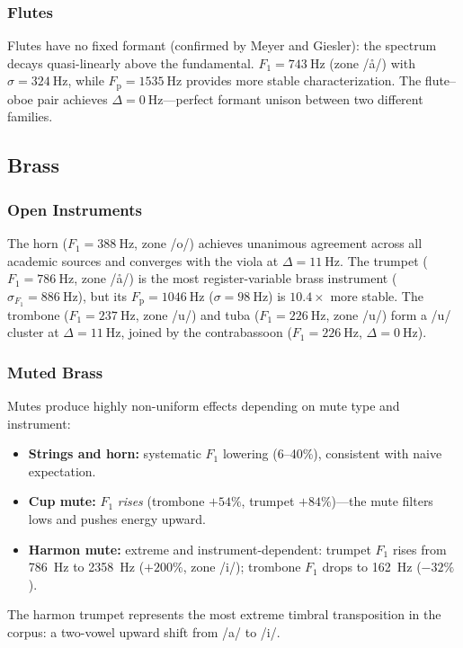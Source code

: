 \documentclass[journal]{IEEEtran}
\newcommand{\Fp}{F_\mathrm{p}}
\newcommand{\Fn}[1]{F_{#1}}
\begin{document}
\subsubsection{Flutes}
Flutes have no fixed formant (confirmed by Meyer and Giesler): the spectrum decays quasi-linearly above the fundamental. $\Fn{1} = \SI{743}{\hertz}$ (zone /\aa/) with $\sigma = \SI{324}{\hertz}$, while $\Fp = \SI{1535}{\hertz}$ provides more stable characterization. The flute--oboe pair achieves $\Delta = \SI{0}{\hertz}$---perfect formant unison between two different families.

\subsection{Brass}

\subsubsection{Open Instruments}
The horn ($\Fn{1} = \SI{388}{\hertz}$, zone /o/) achieves unanimous agreement across all academic sources and converges with the viola at $\Delta = \SI{11}{\hertz}$. The trumpet ($\Fn{1} = \SI{786}{\hertz}$, zone /\aa/) is the most register-variable brass instrument ($\sigma_{\Fn{1}} = \SI{886}{\hertz}$), but its $\Fp = \SI{1046}{\hertz}$ ($\sigma = \SI{98}{\hertz}$) is $10.4\times$ more stable. The trombone ($\Fn{1} = \SI{237}{\hertz}$, zone /u/) and tuba ($\Fn{1} = \SI{226}{\hertz}$, zone /u/) form a /u/ cluster at $\Delta = \SI{11}{\hertz}$, joined by the contrabassoon ($\Fn{1} = \SI{226}{\hertz}$, $\Delta = \SI{0}{\hertz}$).

\subsubsection{Muted Brass}
Mutes produce highly non-uniform effects depending on mute type and instrument:
\begin{itemize}
\item \textbf{Strings and horn:} systematic $\Fn{1}$ lowering (6--40\%), consistent with naive expectation.
\item \textbf{Cup mute:} $\Fn{1}$ \emph{rises} (trombone $+54\%$, trumpet $+84\%$)---the mute filters lows and pushes energy upward.
\item \textbf{Harmon mute:} extreme and instrument-dependent: trumpet $\Fn{1}$ rises from \SI{786}{\hertz} to \SI{2358}{\hertz} ($+200\%$, zone /i/); trombone $\Fn{1}$ drops to \SI{162}{\hertz} ($-32\%$).
\end{itemize}
The harmon trumpet represents the most extreme timbral transposition in the corpus: a two-vowel upward shift from /a/ to /i/.
\end{document}
